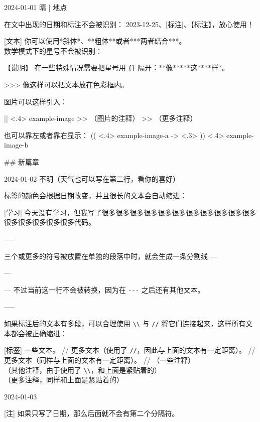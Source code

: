 \documentclass[11pt, paperstyle=light yellow, color entry,
  title in boldface, title in sffamily, use style = classical]{jwjournal}
\begin{document}
2024-01-01 晴 | 地点

  在文中出现的日期和标注不会被识别： 2023-12-25、[标注]、【标注】，放心使用！

  [文本]
    你可以使用*斜体*、**粗体**或者***两者结合***。
    \\
    数学模式下的星号不会被识别：

  【说明】 %
    在一些特殊情况需要把星号用 \texttt{\{\}} 隔开：**像**{}***这***{}*样*。

  >>> 像这样可以把文本放在色彩框内。

  图片可以这样引入：

  || <.4> {example-image} %
  >> （图片的注释）
  >> （更多注释）

  也可以靠左或者靠右显示：
  (( <.4> {example-image-a} %
  -> <.3> %
  )) <.4> {example-image-b} %


## {新篇章}

2024-01-02
不明（天气也可以写在第二行，看你的喜好）

  标签的颜色会根据日期改变，并且很长的文本会自动缩进：

  [学习] 今天没有学习，但我写了很多很多很多很多很多很多很多很多很多很多很多很多很多很多很多很多代码。

  -----

  三个或更多的\textquote{\texttt{-}}符号被放置在单独的段落中时，就会生成一条分割线 ---

  ---

  --- 不过当前这一行不会被转换，因为在 \texttt{-}\texttt{-}\texttt{-} 之后还有其他文本。

  -----

  如果标注后的文本有多段，可以合理使用 \texttt{\textbackslash\textbackslash} 与 \texttt{\slash\slash} 将它们连接起来，这样所有文本都会被正确缩进：

  [标签] 一些文本。
    //
    更多文本（使用了 \texttt{\slash\slash}，因此与上面的文本有一定距离）。
    //
    更多文本（同样与上面的文本有一定距离）。
    //
    （一些注释）
    \\
    （其他注释，由于使用了 \texttt{\textbackslash\textbackslash}，和上面是紧贴着的）
    \\
    （更多注释，同样和上面是紧贴着的）



2024-01-03

  [注] 如果只写了日期，那么后面就不会有第二个分隔符。
\end{document}
